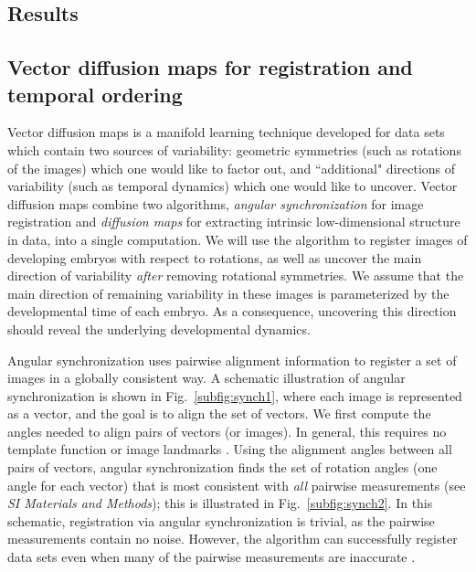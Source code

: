 \documentclass{pnastwo}
\newcommand{\SI}[0]{{\it SI Materials and Methods}}
\newcommand{\fig}[0]{Fig.}
\begin{document}
\begin{article}
\section{Results}

\subsection{Vector diffusion maps for registration and temporal ordering}

Vector diffusion maps \cite{singer2012vector} is a manifold learning
technique developed for data sets which contain two sources of variability:
geometric symmetries (such as rotations of the images) which one would like to factor out,
and ``additional" directions of variability (such as temporal dynamics) which one would like to uncover.
%
Vector diffusion maps combine two algorithms, {\em angular synchronization} \cite{singer2011angular} for image registration and {\em diffusion maps} \cite{coifman2005geometric} for extracting intrinsic low-dimensional structure in data, into a single computation.
%
We will use the algorithm to register images of developing embryos with respect to rotations, as well as uncover the main direction of variability {\it after} removing rotational symmetries.
%
We assume that the main direction of remaining variability in these images is parameterized by the developmental time of each embryo.
%
As a consequence, uncovering this direction should reveal the underlying developmental dynamics.

Angular synchronization uses pairwise alignment information to register a set of images in a globally consistent way.
%
A schematic illustration of angular synchronization is shown in \fig~\ref{subfig:synch1}, where each image is represented as a vector, and the goal is to align the set of vectors.
%
We first compute the angles needed to align pairs of vectors (or images).  
%
In general, this requires no template function \cite{ahuja2007template} or image landmarks \cite{ian1998statistical}.
%
Using the alignment angles between all pairs of vectors, angular synchronization finds the set of rotation angles (one angle for each vector) that is most consistent with {\it all} pairwise measurements (see \SI); this is illustrated in \fig~\ref{subfig:synch2}.
%
In this schematic, registration via angular synchronization is trivial, as the pairwise measurements contain no noise.
%
However, the algorithm can successfully register data sets even when many of the pairwise measurements are inaccurate \cite{singer2011angular}.


\end{article}
\end{document}

